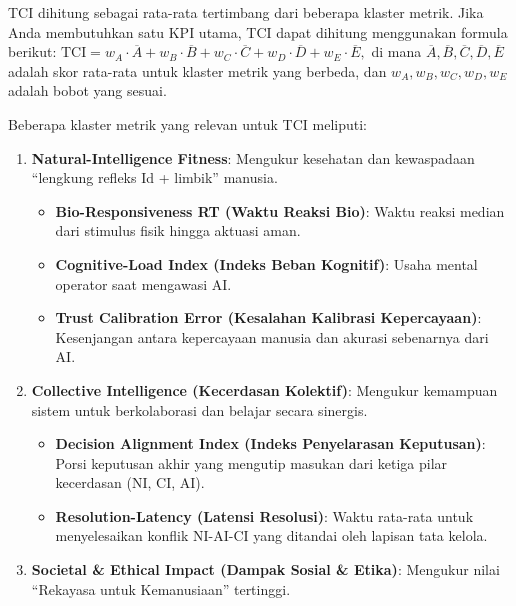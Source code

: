 \documentclass[
  letterpaper,
  DIV=11,
  numbers=noendperiod]{scrreprt}
\providecommand{\tightlist}{%
  \setlength{\itemsep}{0pt}\setlength{\parskip}{0pt}}
\begin{document}
TCI dihitung sebagai rata-rata tertimbang dari beberapa klaster metrik.
Jika Anda membutuhkan satu KPI utama, TCI dapat dihitung menggunakan
formula berikut:
\(\text{TCI}=w_A \cdot \overline{A}+w_B \cdot \overline{B}+w_C \cdot \overline{C}+w_D \cdot \overline{D}+w_E \cdot \overline{E},\)
di mana
\(\overline{A}, \overline{B}, \overline{C}, \overline{D}, \overline{E}\)
adalah skor rata-rata untuk klaster metrik yang berbeda, dan
\(w_A, w_B, w_C, w_D, w_E\) adalah bobot yang sesuai.

Beberapa klaster metrik yang relevan untuk TCI meliputi:

\begin{enumerate}
\def\labelenumi{\arabic{enumi}.}
\tightlist
\item
  \textbf{Natural-Intelligence Fitness}: Mengukur kesehatan dan
  kewaspadaan ``lengkung refleks Id + limbik'' manusia.

  \begin{itemize}
  \tightlist
  \item
    \textbf{Bio-Responsiveness RT (Waktu Reaksi Bio)}: Waktu reaksi
    median dari stimulus fisik hingga aktuasi aman.
  \item
    \textbf{Cognitive-Load Index (Indeks Beban Kognitif)}: Usaha mental
    operator saat mengawasi AI.
  \item
    \textbf{Trust Calibration Error (Kesalahan Kalibrasi Kepercayaan)}:
    Kesenjangan antara kepercayaan manusia dan akurasi sebenarnya dari
    AI.
  \end{itemize}
\item
  \textbf{Collective Intelligence (Kecerdasan Kolektif)}: Mengukur
  kemampuan sistem untuk berkolaborasi dan belajar secara sinergis.

  \begin{itemize}
  \tightlist
  \item
    \textbf{Decision Alignment Index (Indeks Penyelarasan Keputusan)}:
    Porsi keputusan akhir yang mengutip masukan dari ketiga pilar
    kecerdasan (NI, CI, AI).
  \item
    \textbf{Resolution-Latency (Latensi Resolusi)}: Waktu rata-rata
    untuk menyelesaikan konflik NI-AI-CI yang ditandai oleh lapisan tata
    kelola.
  \end{itemize}
\item
  \textbf{Societal \& Ethical Impact (Dampak Sosial \& Etika)}: Mengukur
  nilai ``Rekayasa untuk Kemanusiaan'' tertinggi.


\end{enumerate}
\end{document}
